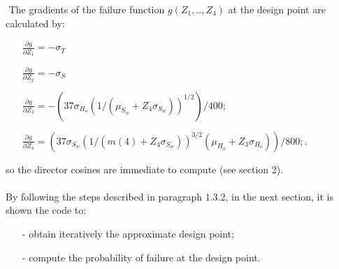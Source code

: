$ $
The gradients of the failure function $g(Z_1,..,Z_4)$ at the design point are calculated by:
\begin{itemize}
\item[]$\frac{\partial g}{\partial Z_1} = - \sigma_T$
\item[]$ \frac{\partial g}{\partial Z_2} = - \sigma_S$
\item[]$ \frac{\partial g}{\partial Z_3} = 
	-(37\sigma_{H_o}(1/(\mu_{S_{w}} + Z_4 \sigma_{S_{w}}))^{1/2})/400 $;
	\item[]$ \frac{\partial g}{\partial Z_4} = (37 \sigma_{S_{w}} (1/(m(4) + Z_4 \sigma_{S_{w}}))^{3/2} 
		(\mu_{H_o} + Z_3\sigma_{H_o}))/800;$.
\end{itemize}
so the director cosines are immediate to compute (see section 2). 
\\\\
By following the steps described in paragraph $1.3.2$, in the next section, it is shown the code to:
\begin{itemize}
\item[-]obtain iteratively the approximate design point;
\item[-]compute the probability of failure at the design point.
\end{itemize}


